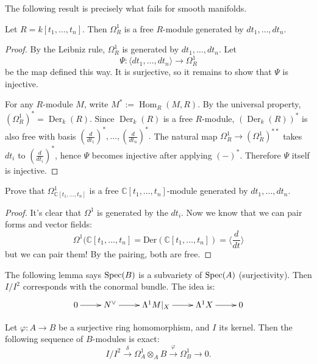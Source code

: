 \noindent
The following result is precisely what
fails for smooth manifolds.

\begin{proposition}
\label{proposition-kahler-differentials-polynomial-ring}
Let $R=k[t_1,\dots,t_n]$.
Then $\Omega^1_R$ is a free $R$-module
generated by $dt_1,\dots,dt_n$.
\end{proposition}

\begin{proof}
By the Leibniz rule, $\Omega^1_R$ is
generated by $dt_1,\dots,dt_n$.
Let
$$
\Psi:\langle dt_1,\dots,dt_n\rangle
\to \Omega^1_R
$$
be the map defined this way. It is
surjective, so it remains to show that
$\Psi$ is injective.

For any $R$-module $M$, write
$M^\ast:=\operatorname{Hom}_R(M,R)$.
By the universal property,
$(\Omega^1_R)^\ast=\operatorname{Der}_k(R)$.
Since $\operatorname{Der}_k(R)$ is a free
$R$-module, $(\operatorname{Der}_k(R))^\ast$
is also free with basis
$
\left(\frac{d}{dt_1}\right)^\ast,\dots,
\left(\frac{d}{dt_n}\right)^\ast.
$
The natural map
$\Omega^1_R\to (\Omega^1_R)^{\ast\ast}$
takes $dt_i$ to
$\left(\frac{d}{dt_i}\right)^\ast$, hence
$\Psi$ becomes injective after applying
$(-)^\ast$. Therefore $\Psi$ itself is
injective.
\end{proof}

\begin{exercise}
\label{exercise-kahler-differentials-polynomial-ring}
Prove that
$\Omega^1_{\mathbb{C}[t_1,\dots,t_n]}$
is a free $\mathbb{C}[t_1,\dots,t_n]$-module
generated by $dt_1,\dots,dt_n$.
\end{exercise}

\begin{proof}
It's clear that $\Omega^1$ is generated
by the $dt_i$.
Now we know that we can pair forms
and vector fields:
$$
\Omega^1(\mathbb{C}[t_1,…,t_n]
=
\text{Der}(\mathbb{C}[t_1,…,t_n])
=\langle \frac{d}{dt}\rangle
$$
but we can pair them! By the pairing,
both are free.
\end{proof}

\noindent
The following lemma says $\mathop{\mathrm{Spec}}(B)$
is a subvariety of $\mathop{\mathrm{Spec}}(A)$ (surjectivity).
Then $I/I^2$ corresponds
with the conormal bundle.
The idea is:
$$
\xymatrix{
0\ar[r]
&N^\vee\ar[r]
&\Lambda^1M|_X\ar[r]
&\Lambda^1X\ar[r]
&0
}
$$

\begin{lemma}
\label{lemma-exact-sequence-kahler-differentials}
Let $\varphi:A\to B$ be a surjective ring
homomorphism, and $I$ its kernel. Then the
following sequence of $B$-modules is exact:
$$
I/I^2\xrightarrow{\delta}
\Omega^1_A\otimes_A B
\xrightarrow{\varphi}
\Omega^1_B\to 0.
$$
\end{lemma}

